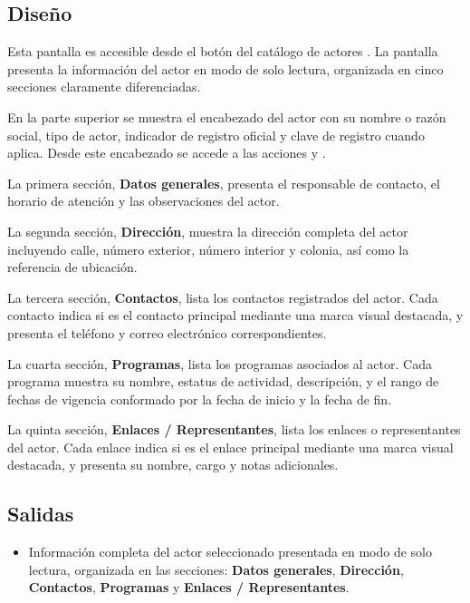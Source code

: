 \subsection{Diseño}
Esta pantalla  es accesible desde 
el botón  del catálogo de actores . La pantalla presenta la 
información del actor en modo de solo lectura, organizada en cinco secciones 
claramente diferenciadas.

En la parte superior se muestra el encabezado del actor con su nombre o razón 
social, tipo de actor, indicador de registro oficial y clave de registro cuando 
aplica. Desde este encabezado se accede a las acciones  y 
.

La primera sección, \textbf{Datos generales}, presenta el responsable de 
contacto, el horario de atención y las observaciones del actor.

La segunda sección, \textbf{Dirección}, muestra la dirección completa del actor 
incluyendo calle, número exterior, número interior y colonia, así como la 
referencia de ubicación.

La tercera sección, \textbf{Contactos}, lista los contactos registrados del 
actor. Cada contacto indica si es el contacto principal mediante una marca 
visual destacada, y presenta el teléfono y correo electrónico correspondientes.

La cuarta sección, \textbf{Programas}, lista los programas asociados al actor. 
Cada programa muestra su nombre, estatus de actividad, descripción, y el rango 
de fechas de vigencia conformado por la fecha de inicio y la fecha de fin.

La quinta sección, \textbf{Enlaces / Representantes}, lista los enlaces o 
representantes del actor. Cada enlace indica si es el enlace principal mediante 
una marca visual destacada, y presenta su nombre, cargo y notas adicionales.


\subsection{Salidas}
\begin{itemize}
	\item Información completa del actor seleccionado presentada en modo de 
	solo lectura, organizada en las secciones: \textbf{Datos generales}, 
	\textbf{Dirección}, \textbf{Contactos}, \textbf{Programas} y 
	\textbf{Enlaces / Representantes}.
\end{itemize}


